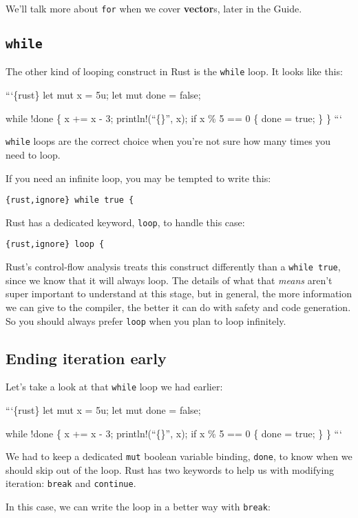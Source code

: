 \documentclass[]{article}
\begin{document}
We'll talk more about \texttt{for} when we cover \textbf{vector}s, later
in the Guide.

\subsection{\texttt{while}}\label{while}

The other kind of looping construct in Rust is the \texttt{while} loop.
It looks like this:

```\{rust\} let mut x = 5u; let mut done = false;

while !done \{ x += x - 3; println!(``\{\}'', x); if x \% 5 == 0 \{ done
= true; \} \} ```

\texttt{while} loops are the correct choice when you're not sure how
many times you need to loop.

If you need an infinite loop, you may be tempted to write this:

\texttt{\{rust,ignore\} while true \{}

Rust has a dedicated keyword, \texttt{loop}, to handle this case:

\texttt{\{rust,ignore\} loop \{}

Rust's control-flow analysis treats this construct differently than a
\texttt{while true}, since we know that it will always loop. The details
of what that \emph{means} aren't super important to understand at this
stage, but in general, the more information we can give to the compiler,
the better it can do with safety and code generation. So you should
always prefer \texttt{loop} when you plan to loop infinitely.

\subsection{Ending iteration early}\label{ending-iteration-early}

Let's take a look at that \texttt{while} loop we had earlier:

```\{rust\} let mut x = 5u; let mut done = false;

while !done \{ x += x - 3; println!(``\{\}'', x); if x \% 5 == 0 \{ done
= true; \} \} ```

We had to keep a dedicated \texttt{mut} boolean variable binding,
\texttt{done}, to know when we should skip out of the loop. Rust has two
keywords to help us with modifying iteration: \texttt{break} and
\texttt{continue}.

In this case, we can write the loop in a better way with \texttt{break}:
\end{document}
